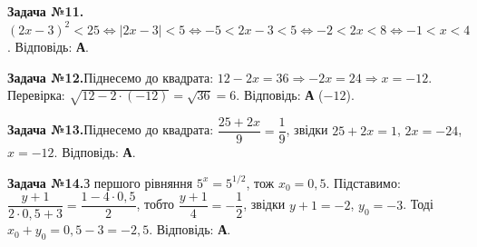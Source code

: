 \documentclass[12pt]{article}
\begin{document}
\par\vspace{0.3cm}\noindent\hypertarget{sol:11}{}
\begin{tcolorbox}[colback=titleBg!40, colframe=mainGreen!55, boxrule=0.4pt, arc=2pt, left=6pt, right=6pt, top=4pt, bottom=4pt, breakable]
\noindent\small\textbf{Задача №11.}\quad $(2x-3)^2<25\iff |2x-3|<5\iff -5<2x-3<5\iff -2<2x<8\iff -1<x<4$. Відповідь: \textbf{А}.
\par\vspace{0.1cm}\hfill\hyperlink{task:11}{}
\end{tcolorbox}
\par\vspace{0.3cm}\noindent\hypertarget{sol:12}{}
\begin{tcolorbox}[colback=titleBg!40, colframe=mainGreen!55, boxrule=0.4pt, arc=2pt, left=6pt, right=6pt, top=4pt, bottom=4pt, breakable]
\noindent\small\textbf{Задача №12.}\quad Піднесемо до квадрата: $12-2x=36\Rightarrow -2x=24\Rightarrow x=-12$. Перевірка: $\sqrt{12-2\cdot(-12)}=\sqrt{36}=6$. Відповідь: \textbf{А} ($-12$).
\par\vspace{0.1cm}\hfill\hyperlink{task:12}{}
\end{tcolorbox}
\par\vspace{0.3cm}\noindent\hypertarget{sol:13}{}
\begin{tcolorbox}[colback=titleBg!40, colframe=mainGreen!55, boxrule=0.4pt, arc=2pt, left=6pt, right=6pt, top=4pt, bottom=4pt, breakable]
\noindent\small\textbf{Задача №13.}\quad Піднесемо до квадрата: $\dfrac{25+2x}{9}=\dfrac{1}{9}$, звідки $25+2x=1$, $2x=-24$, $x=-12$. Відповідь: \textbf{А}.
\par\vspace{0.1cm}\hfill\hyperlink{task:13}{}
\end{tcolorbox}
\par\vspace{0.3cm}\noindent\hypertarget{sol:14}{}
\begin{tcolorbox}[colback=titleBg!40, colframe=mainGreen!55, boxrule=0.4pt, arc=2pt, left=6pt, right=6pt, top=4pt, bottom=4pt, breakable]
\noindent\small\textbf{Задача №14.}\quad З першого рівняння $5^x=5^{1/2}$, тож $x_0=0{,}5$. Підставимо: $\dfrac{y+1}{2\cdot 0{,}5+3}=\dfrac{1-4\cdot 0{,}5}{2}$, тобто $\dfrac{y+1}{4}=-\dfrac{1}{2}$, звідки $y+1=-2$, $y_0=-3$. Тоді $x_0+y_0=0{,}5-3=-2{,}5$. Відповідь: \textbf{А}.
\par\vspace{0.1cm}\hfill\hyperlink{task:14}{}
\end{tcolorbox}
\end{document}

